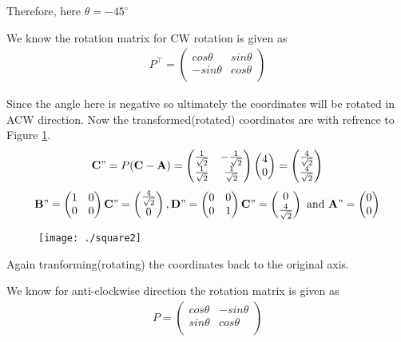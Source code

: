 \documentclass[12pt]{article}
\newcommand{\myvec}[1]{\ensuremath{\begin{pmatrix}#1\end{pmatrix}}}
\let\vec\mathbf
\begin{document}
Therefore, here $\theta = -45^{\circ}$

We know the rotation matrix for CW rotation is given as
\begin{align*}
P^\top =
\myvec{
cos\theta & sin\theta \\
-sin\theta & cos\theta \\
}
\end{align*}

Since the angle here is negative so ultimately the coordinates will be rotated in ACW direction. Now the transformed(rotated) coordinates are with refrence to Figure \ref{fig:Fig3}.
\begin{align*}
\vec{C"} = P(\vec{C}-\vec{A}) =
\myvec{
\frac{1}{\sqrt{2}} & -\frac{1}{\sqrt{2}} \\
\frac{1}{\sqrt{2}} & \frac{1}{\sqrt{2}}\\
}
\myvec{
4 \\
0\\
} = 
\myvec{
\frac{4}{\sqrt{2}} \\
\frac{4}{\sqrt{2}}\\
}
\end{align*}
\begin{align*}
\vec{B"} = \myvec{
 1&0\\
 0&0\\
}\vec{C"}=
\myvec{
 \frac{4}{\sqrt{2}}\\
 0\\
},
\vec{D"} = \myvec{
 0&0\\
 0&1\\
}\vec{C"}=
\myvec{
 0\\
 \frac{4}{\sqrt{2}}\\
} \text{ and }
\vec{A"} =
\myvec{
0 \\
0\\
}
\end{align*}

\begin{figure}[!h]
	\begin{center} 
	    \texttt{[image: ./square2]}
	\end{center}
\caption{}
\label{fig:Fig3}
\end{figure}

\newpage
Again tranforming(rotating) the coordinates back to the original axis.

We know for anti-clockwise direction the rotation matrix is given as
\begin{align*}
P =
\myvec{
cos\theta & -sin\theta \\
sin\theta & cos\theta \\
}
\end{align*}
\end{document}
